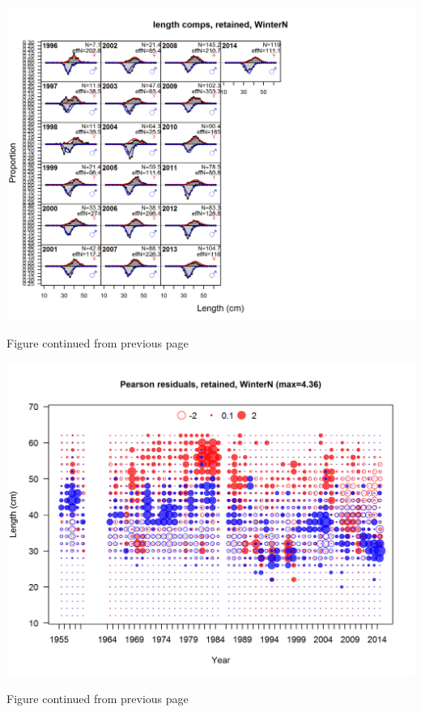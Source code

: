 \documentclass[12pt,]{article}
\begin{document}
\includegraphics{./r4ss/plots_mod1/comp_lenfit_flt1mkt2_page2.png}

\begin{center} 

              Figure continued from previous page 

             \end{center}

\includegraphics{./r4ss/plots_mod1/comp_lenfit_residsflt1mkt2_page2.png}

\begin{center} 

              Figure continued from previous page 

             \end{center}
\end{document}

